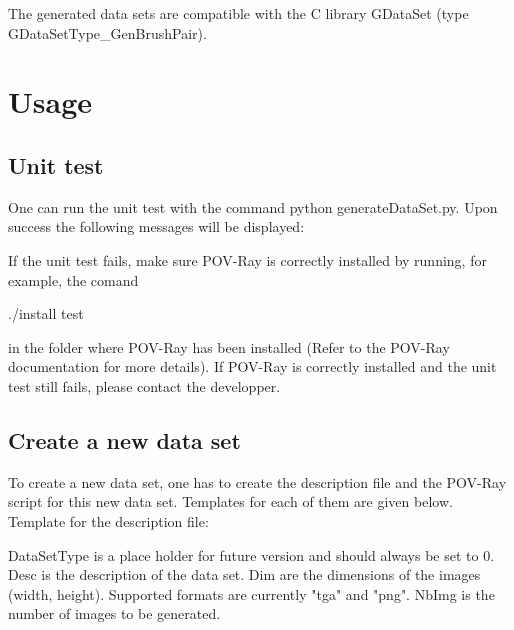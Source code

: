 The generated data sets are compatible with the C library GDataSet (type GDataSetType\_GenBrushPair).\\

\section{Usage}

\subsection{Unit test}

One can run the unit test with the command python generateDataSet.py. Upon success the following messages will be displayed:

\begin{scriptsize}
\begin{ttfamily}

\end{ttfamily}
\end{scriptsize}

If the unit test fails, make sure POV-Ray is correctly installed by running, for example, the comand \begin{ttfamily}./install test\end{ttfamily} in the folder where POV-Ray has been installed (Refer to the POV-Ray documentation for more details). If POV-Ray is correctly installed and the unit test still fails, please contact the developper.

\subsection{Create a new data set}

To create a new data set, one has to create the description file and the POV-Ray script for this new data set. Templates for each of them are given below.\\
 
Template for the description file:\\
\begin{scriptsize}
\begin{ttfamily}

\end{ttfamily}
\end{scriptsize}

DataSetType is a place holder for future version and should always be set to 0. Desc is the description of the data set. Dim are the dimensions of the images (width, height). Supported formats are currently "tga" and "png". NbImg is the number of images to be generated.\\


